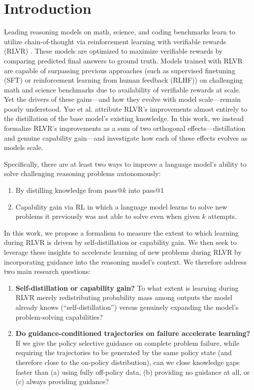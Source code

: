 \documentclass{article}
\begin{document}
\section{Introduction}
Leading reasoning models on math, science, and coding benchmarks learn to utilize chain-of-thought via reinforcement learning with verifiable rewards (RLVR) \cite{openai2024o1, guo2025deepseekr1, lambert2024tulu3, havrilla2024teaching}. These models are optimized to maximize verifiable rewards by comparing predicted final answers to ground truth. Models trained with RLVR are capable of surpassing previous approaches (such as supervised finetuning (SFT) or reinforcement learning from human feedback (RLHF)) on challenging math and science benchmarks due to availability of verifiable rewards at scale. Yet the drivers of these gains—and how they evolve with model scale—remain poorly understood. Yue et al. \citep{yue2025does} attribute RLVR’s improvements almost entirely to the distillation of the base model’s existing knowledge. In this work, we instead formalize RLVR's improvements as a sum of two orthogonal effects—distillation and genuine capability gain—and investigate how each of these effects evolves as models scale.

Specifically, there are at least two ways to improve a language model's ability to solve challenging reasoning problems autonomously:
\begin{enumerate}[leftmargin=2em]
    \item By distilling knowledge from pass@$k$ into pass@1 \cite{zelikman2022star, gulcehre2023rest, openai2024rft, singh2024beyond, hosseini2024vstar, zhang2024restmcts}
    \item Capability gain via RL in which a language model learns to solve new problems it previously was not able to solve even when given $k$ attempts.
\end{enumerate}

In this work, we propose a formalism to measure the extent to which learning during RLVR is driven by self-distillation or capability gain. We then seek to leverage these insights to accelerate learning of new problems during RLVR by incorporating guidance into the reasoning model's context. We therefore address two main research questions:
\begin{enumerate}[leftmargin=2em]
  \item \textbf{Self-distillation or capability gain?}  To what extent is learning during RLVR merely redistributing probability mass among outputs the model already knows (“self-distillation”) versus genuinely expanding the model’s problem-solving capabilities?

  \item \textbf{Do guidance-conditioned trajectories on failure accelerate learning?}  
      If we give the policy selective guidance on complete problem failure, while requiring the trajectories to be generated by the same policy state (and therefore close to the on-policy distribution), can we close knowledge gaps faster than (a) using fully off-policy data, (b) providing no guidance at all, or (c) always providing guidance?
\end{enumerate}
\end{document}
